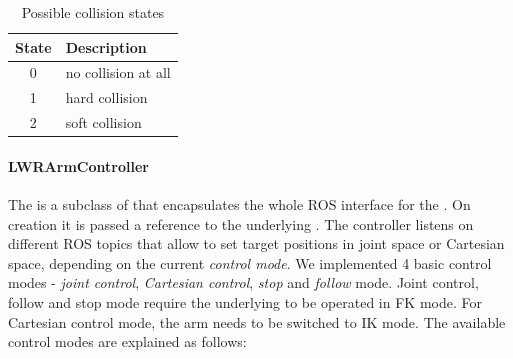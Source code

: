 \begin{table}[h]
  \centering
  \begin{tabular}{|c|l|} \hline
	\textbf{State} & \textbf{Description} \\ \hline
	0 & no collision at all \\
	1 & hard collision \\
	2 & soft collision \\ \hline
  \end{tabular}
  \caption{Possible collision states}
  \label{tbl:col_states}
\end{table}

\paragraph{LWRArmController}

The  is a subclass of  that encapsulates the whole ROS interface for the . On creation it is passed a reference to the underlying . The controller listens on different ROS topics that allow to set target positions in joint space or Cartesian space, depending on the current \emph{control mode}. We implemented 4 basic control modes - \emph{joint control}, \emph{Cartesian control}, \emph{stop} and \emph{follow} mode. Joint control, follow and stop mode require the underlying  to be operated in FK mode. For Cartesian control mode, the arm needs to be switched to IK mode. The available control modes are explained as follows:

